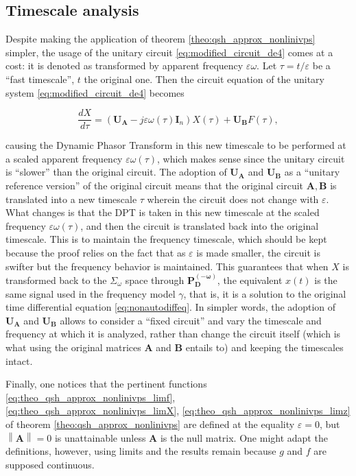 \subsection{Timescale analysis} %

	Despite making the application of theorem \ref{theo:qsh_approx_nonlinivps} simpler, the usage of the unitary circuit \eqref{eq:modified_circuit_de4} comes at a cost: it is denoted as transformed by apparent frequency $\varepsilon\omega$. Let $\tau = t/\varepsilon$ be a ``fast timescale'', $t$ the original one. Then the circuit equation of the unitary system \eqref{eq:modified_circuit_de4} becomes

\begin{equation} \dfrac{dX}{d\tau} = \left(\mathbf{U_A} - j\varepsilon\omega\left(\tau\right) \mathbf{I}_n\right) X\left(\tau\right) + \mathbf{U_B} F\left(\tau\right) ,\end{equation}

	\noindent causing the Dynamic Phasor Transform in this new timescale to be performed at a scaled apparent frequency $\varepsilon\omega\left(\tau\right)$, which makes sense since the unitary circuit is ``slower'' than the original circuit. The adoption of $\mathbf{U_A}$ and $\mathbf{U_B}$ as a ``unitary reference version'' of the original circuit means that the original circuit $\mathbf{A,B}$ is translated into a new timescale $\tau$ wherein the circuit does not change with $\varepsilon$. What changes is that the DPT is taken in this new timescale at the scaled frequency $\varepsilon\omega\left(\tau\right)$, and then the circuit is translated back into the original timescale. This is to maintain the frequency timescale, which should be kept because the proof relies on the fact that as $\varepsilon$ is made smaller, the circuit is swifter but the frequency behavior is maintained. This guarantees that when $X$ is transformed back to the $\Sigma_\omega$ space through $\mathbf{P_D^{\left(-\omega\right)}}$, the equivalent $x(t)$ is the same signal used in the frequency model $\gamma$, that is, it is a solution to the original time differential equation \eqref{eq:nonautodiffeq}. In simpler words, the adoption of $\mathbf{U_A}$ and $\mathbf{U_B}$ allows to consider a ``fixed circuit'' and vary the timescale and frequency at which it is analyzed, rather than change the circuit itself (which is what using the original matrices $\mathbf{A}$ and $\mathbf{B}$ entails to) and keeping the timescales intact.

	Finally, one notices that the pertinent functions \eqref{eq:theo_qsh_approx_nonlinivps_limf}, \eqref{eq:theo_qsh_approx_nonlinivps_limX}, \eqref{eq:theo_qsh_approx_nonlinivps_limz} of theorem \ref{theo:qsh_approx_nonlinivps} are defined at the equality $\varepsilon = 0$, but $\left\lVert \mathbf{A}\right\rVert = 0$ is unattainable unless $\mathbf{A}$ is the null matrix. One might adapt the definitions, however, using limits and the results remain because $g$ and $f$ are supposed continuous.


